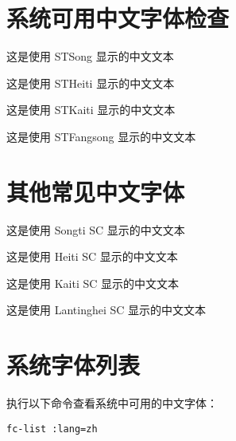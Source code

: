 \documentclass{article}
\begin{document}
\section{系统可用中文字体检查}

\bigskip
{}
这是使用 STSong 显示的中文文本

这是使用 STHeiti 显示的中文文本

这是使用 STKaiti 显示的中文文本

这是使用 STFangsong 显示的中文文本

\bigskip
\section{其他常见中文字体}

这是使用 Songti SC 显示的中文文本

这是使用 Heiti SC 显示的中文文本

这是使用 Kaiti SC 显示的中文文本

这是使用 Lantinghei SC 显示的中文文本

\section{系统字体列表}
执行以下命令查看系统中可用的中文字体：
\begin{verbatim}
fc-list :lang=zh
\end{verbatim}
\end{document}
